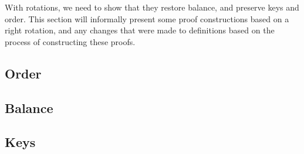 With rotations, we need to show that they restore balance, and preserve keys and order. This section will informally present some proof constructions based on a right rotation, and any changes that were made to definitions based on the process of constructing these proofs.

\subsection*{Order}


\subsection*{Balance}


\subsection*{Keys}

